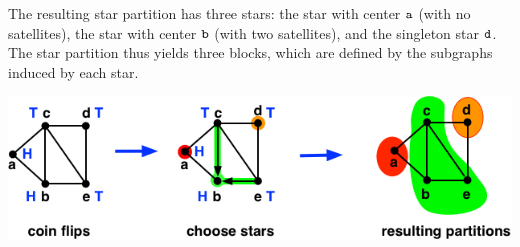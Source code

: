 \begin{flex}
\begin{example}
The resulting star partition has three stars: the star with center $\texttt{a}$ (with no
satellites), the star with center $\texttt{b}$ (with two satellites),
and the singleton star $\texttt{d}$.
%
The star partition thus yields three blocks, which are defined by the
subgraphs induced by each star.

\begin{center}
  \includegraphics[width=6in]{./graph-contraction/media-star/star-find0.jpg}
\end{center}

\end{example}
\end{flex}



